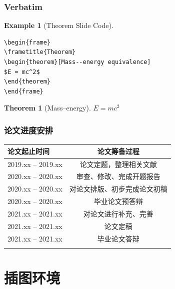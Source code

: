 \documentclass[11pt,compress]{beamer}
\newtheorem{thm}{Theorem}
\numberwithin{thm}{section}
\numberwithin{defn}{section}
\numberwithin{lmm}{section}
\theoremstyle{example}
\newtheorem{exam}{Example}
\numberwithin{figure}{section}
\numberwithin{table}{section}
\numberwithin{equation}{section}
\begin{document}
\begin{frame}[fragile] %
\frametitle{Verbatim}
\begin{exam}[Theorem Slide Code]
\begin{verbatim}
\begin{frame}
\frametitle{Theorem}
\begin{theorem}[Mass--energy equivalence]
$E = mc^2$
\end{theorem}
\end{frame}\end{verbatim}
\end{exam}

\begin{thm}[Mass--energy]
$E = mc^2$
\end{thm}

\end{frame}


\begin{frame}
\frametitle{论文进度安排}
\begin{table}[htp!]
\centering
\renewcommand\arraystretch{1.3} %
\begin{tabularx}{0.92\textwidth}{|P{3.2cm}|C|}
\Xhline{2\arrayrulewidth}
论文起止时间       &  论文筹备过程\\
\hline
2019.xx -- 2019.xx    &  论文定题，整理相关文献\\
\hline
2020.xx -- 2020.xx    &  审查、修改、完成开题报告\\
\hline
2020.xx -- 2020.xx   &  对论文排版、初步完成论文初稿\\
\hline
2020.xx -- 2020.xx    &  毕业论文预答辩\\
\hline
2021.xx -- 2021.xx    &  对论文进行补充、完善\\
\hline
2021.xx -- 2021.xx    &  论文定稿\\
\hline
2021.xx -- 2021.xx    &  毕业论文答辩\\
\Xhline{2\arrayrulewidth}
\end{tabularx}
\end{table}

\end{frame}



\section{插图环境}
\end{document}
